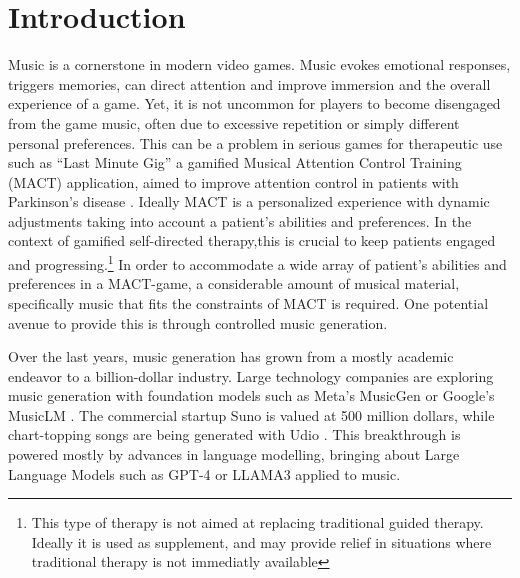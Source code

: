 

\chapter{Introduction}
\label{chap:intro}
\pagestyle{fancy}

Music is a cornerstone in modern video games. Music evokes emotional responses, triggers memories, can direct attention and improve immersion and the overall experience of a game. Yet, it is not uncommon for players to become disengaged from the game music, often due to excessive repetition or simply different personal preferences.\cite{Rogers_Weber_2019} This can be a problem in serious games for therapeutic use such as “Last Minute Gig” a gamified Musical Attention Control Training (MACT) application, aimed to improve attention control in patients with Parkinson’s disease \cite{Chalkiadakis_2022}. Ideally MACT is a personalized experience with dynamic adjustments taking into account a patient's abilities and preferences. In the context of gamified self-directed therapy,this is crucial to keep patients engaged and progressing.\footnote{This type of therapy is not aimed at replacing traditional guided therapy. Ideally it is used as supplement, and may provide relief in situations where traditional therapy is not immediatly available} In order to accommodate a wide array of patient's abilities and preferences in a MACT-game, a considerable amount of musical material, specifically music that fits the constraints of MACT is required. One potential avenue to provide this is through controlled music generation.


Over the last years, music generation has grown from a mostly academic endeavor to a billion-dollar industry. Large technology companies are exploring music generation with foundation models such as Meta’s MusicGen\cite{copet2023simple} or Google’s MusicLM 
\cite{Agostinelli_Denk_Borsos_Engel_Verzetti_Caillon_Huang_Jansen_Roberts_Tagliasacchi_et_al._2023}. The commercial startup Suno is valued at 500 million dollars, while chart-topping songs are being generated with Udio \cite{Ferdinand_Meyen_2024}\cite{Stassen_2024}. This breakthrough is powered mostly by advances in language modelling, bringing about Large Language Models such as GPT-4 or LLAMA3 applied to music.

